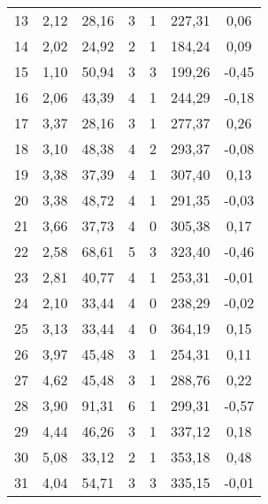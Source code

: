 \begin{table}[h]
\begin{tabular}{c|ccccc|c}
13               & 2,12             & 28,16         & 3            & 1              & 227,31      & 0,06           \\
14               & 2,02             & 24,92         & 2            & 1              & 184,24      & 0,09           \\
15               & 1,10             & 50,94         & 3            & 3              & 199,26      & -0,45          \\
16               & 2,06             & 43,39         & 4            & 1              & 244,29      & -0,18          \\
17               & 3,37             & 28,16         & 3            & 1              & 277,37      & 0,26           \\
18               & 3,10             & 48,38         & 4            & 2              & 293,37      & -0,08          \\
19               & 3,38             & 37,39         & 4            & 1              & 307,40      & 0,13           \\
20               & 3,38             & 48,72         & 4            & 1              & 291,35      & -0,03          \\
21               & 3,66             & 37,73         & 4            & 0              & 305,38      & 0,17           \\
22               & 2,58             & 68,61         & 5            & 3              & 323,40      & -0,46          \\
23               & 2,81             & 40,77         & 4            & 1              & 253,31      & -0,01          \\
24               & 2,10             & 33,44         & 4            & 0              & 238,29      & -0,02          \\
25               & 3,13             & 33,44         & 4            & 0              & 364,19      & 0,15           \\
26               & 3,97             & 45,48         & 3            & 1              & 254,31      & 0,11           \\
27               & 4,62             & 45,48         & 3            & 1              & 288,76      & 0,22           \\
28               & 3,90             & 91,31         & 6            & 1              & 299,31      & -0,57          \\
29               & 4,44             & 46,26         & 3            & 1              & 337,12      & 0,18           \\
30               & 5,08             & 33,12         & 2            & 1              & 353,18      & 0,48           \\
31               & 4,04             & 54,71         & 3            & 3              & 335,15      & -0,01          \\ \hline
\end{tabular}
\end{table}


